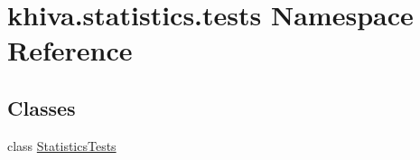 \hypertarget{namespacekhiva_1_1statistics_1_1tests}{}\section{khiva.\+statistics.\+tests Namespace Reference}
\label{namespacekhiva_1_1statistics_1_1tests}
\subsection*{Classes}
\begin{DoxyCompactItemize}
\item 
class \mbox{\hyperlink{classkhiva_1_1statistics_1_1tests_1_1_statistics_tests}{Statistics\+Tests}}
\end{DoxyCompactItemize}
